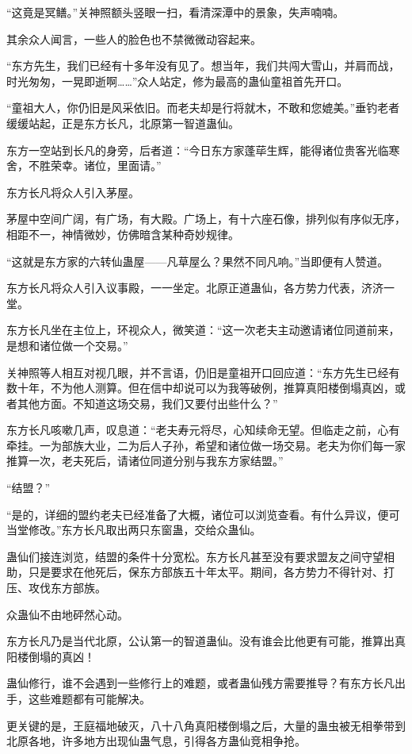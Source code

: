 \begin{this_body}
“这竟是冥鳝。”关神照额头竖眼一扫，看清深潭中的景象，失声喃喃。

其余众人闻言，一些人的脸色也不禁微微动容起来。

“东方先生，我们已经有十多年没有见了。想当年，我们共闯大雪山，并肩而战，时光匆匆，一晃即逝啊……”众人站定，修为最高的蛊仙童祖首先开口。

“童祖大人，你仍旧是风采依旧。而老夫却是行将就木，不敢和您媲美。”垂钓老者缓缓站起，正是东方长凡，北原第一智道蛊仙。

东方一空站到长凡的身旁，后者道：“今日东方家蓬荜生辉，能得诸位贵客光临寒舍，不胜荣幸。诸位，里面请。”

东方长凡将众人引入茅屋。

茅屋中空间广阔，有广场，有大殿。广场上，有十六座石像，排列似有序似无序，相距不一，神情微妙，仿佛暗含某种奇妙规律。

“这就是东方家的六转仙蛊屋——凡草屋么？果然不同凡响。”当即便有人赞道。

东方长凡将众人引入议事殿，一一坐定。北原正道蛊仙，各方势力代表，济济一堂。

东方长凡坐在主位上，环视众人，微笑道：“这一次老夫主动邀请诸位同道前来，是想和诸位做一个交易。”

关神照等人相互对视几眼，并不言语，仍旧是童祖开口回应道：“东方先生已经有数十年，不为他人测算。但在信中却说可以为我等破例，推算真阳楼倒塌真凶，或者其他方面。不知道这场交易，我们又要付出些什么？”

东方长凡咳嗽几声，叹息道：“老夫寿元将尽，心知续命无望。但临走之前，心有牵挂。一为部族大业，二为后人子孙，希望和诸位做一场交易。老夫为你们每一家推算一次，老夫死后，请诸位同道分别与我东方家结盟。”

“结盟？”

“是的，详细的盟约老夫已经准备了大概，诸位可以浏览查看。有什么异议，便可当堂修改。”东方长凡取出两只东窗蛊，交给众蛊仙。

蛊仙们接连浏览，结盟的条件十分宽松。东方长凡甚至没有要求盟友之间守望相助，只是要求在他死后，保东方部族五十年太平。期间，各方势力不得针对、打压、攻伐东方部族。

众蛊仙不由地砰然心动。

东方长凡乃是当代北原，公认第一的智道蛊仙。没有谁会比他更有可能，推算出真阳楼倒塌的真凶！

蛊仙修行，谁不会遇到一些修行上的难题，或者蛊仙残方需要推导？有东方长凡出手，这些难题都有可能解决。

更关键的是，王庭福地破灭，八十八角真阳楼倒塌之后，大量的蛊虫被无相拳带到北原各地，许多地方出现仙蛊气息，引得各方蛊仙竞相争抢。


\end{this_body}
